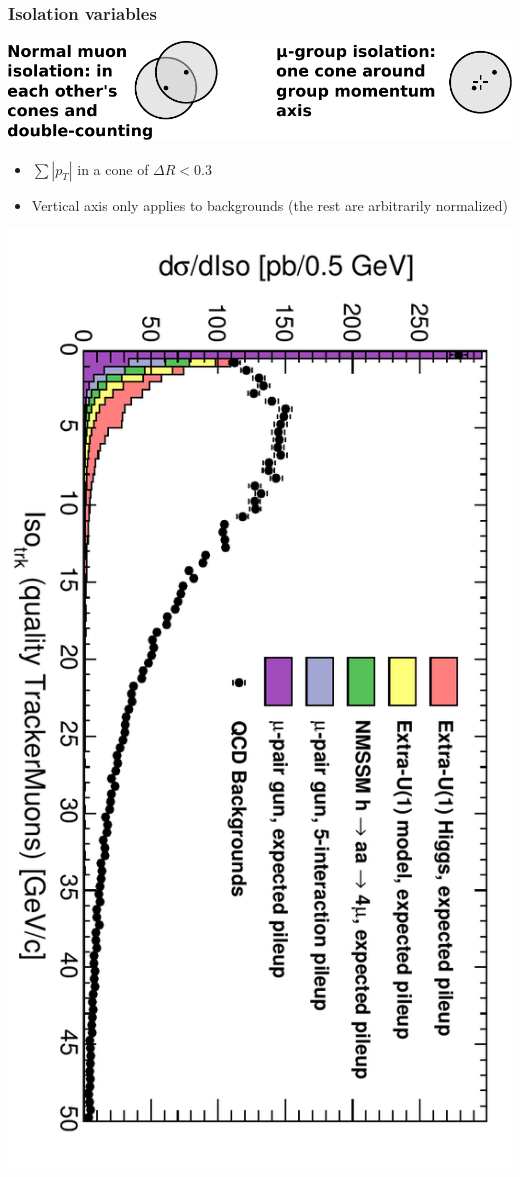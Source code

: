 \documentclass[compress]{beamer}
\begin{document}
\begin{frame}
\frametitle{Isolation variables}
\begin{center}
\includegraphics[width=0.7\linewidth]{isolation.pdf}
\end{center}
\begin{itemize}
\item $\sum |p_T|$ in a cone of $\Delta R < 0.3$
\item Vertical axis only applies to backgrounds (the rest are arbitrarily normalized)
\end{itemize}
\begin{center}
\includegraphics[height=0.8\linewidth, angle=90]{tkisolation_QualityTrackerMuonAny_all.pdf}
\end{center}
\end{frame}
\end{document}
